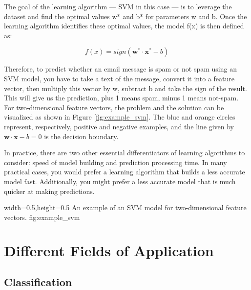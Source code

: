 \begin{description}
The goal of the learning algorithm — SVM in this case — is to leverage the dataset and find the optimal values w* and b* for parameters w and b. Once the learning algorithm identifies these optimal values, the model f(x) is then defined as:

\begin{equation}
	f(x) = sign(\textbf{w}^{*} \cdot \textbf{x}^{*} - b)
\end{equation}

Therefore, to predict whether an email message is spam or not spam using an SVM model, you have to take a text of the message, convert it into a feature vector, then multiply this vector by w\*, subtract b\* and take the sign of the result. 
This will give us the prediction, plus 1 means spam, minus 1 means not-spam. \\
For two-dimensional feature vectors, the problem and the solution can be visualized as shown in Figure \ref{fig:example_svm}. The blue and orange circles represent, respectively, positive and negative
examples, and the line given by $\textbf{w} \cdot \textbf{x} - b = 0$ is the decision boundary.
\end{description}

In practice, there are two other essential differentiators of learning algorithms to consider: speed of model building and prediction processing time. In many practical cases, you would prefer a learning algorithm that builds a less accurate model fast. Additionally, you might prefer a less accurate model that is much quicker at making predictions.


  {width=0.5\textwidth,height=0.5\textheight}%
  {An example of an SVM model for two-dimensional feature vectors.}%
  {}%
  {fig:example_svm}%
  
  


\cite{thehundrerpageMLbook}



\section{Different Fields of Application}

\subsection{Classification}

